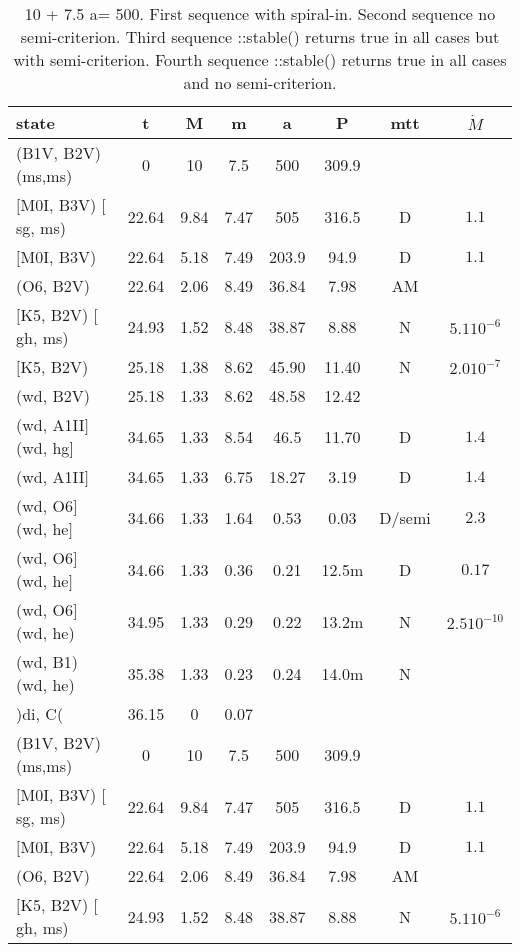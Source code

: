 \documentclass{article}
\begin{document}
\begin{table}
\caption{10 + 7.5 a= 500. 
First sequence with spiral-in.
Second sequence no semi-criterion.
Third sequence ::stable() returns true in all cases but with semi-criterion.
Fourth sequence ::stable() returns true in all cases and no semi-criterion.
}
\begin{tabular}{p{4cm}ccccccc}
\hline
state	 		& t	& M	& m	& a	& P	& mtt	&$\dot{M}$	\\ \hline 
(B1V, B2V) (ms,ms)	& 0	& 10	& 7.5	& 500	& 309.9	&	&			\\
$[$M0I, B3V) $[$sg, ms)	& 22.64	& 9.84	& 7.47	& 505	& 316.5	& D	& $1.1$			\\
$[$M0I, B3V)	 	& 22.64	& 5.18	& 7.49	& 203.9	& 94.9	& D	& $1.1$			\\
(O6, B2V)	 	& 22.64	& 2.06	& 8.49	& 36.84	& 7.98	& AM	&			\\
$[$K5, B2V) $[$gh, ms)	& 24.93	& 1.52	& 8.48	& 38.87	& 8.88	& N	& $5.1 10^{-6}$		\\
$[$K5, B2V)	 	& 25.18	& 1.38	& 8.62	& 45.90	& 11.40	& N	& $2.0 10^{-7}$		\\
(wd, B2V)	 	& 25.18	& 1.33	& 8.62	& 48.58	& 12.42	&	&			\\
(wd, A1II$]$ (wd, hg$]$	& 34.65	& 1.33	& 8.54	& 46.5 	& 11.70	& D	& $1.4$			\\
(wd, A1II$]$	 	& 34.65	& 1.33	& 6.75	& 18.27	& 3.19	& D	& $1.4$			\\
(wd, O6$]$ (wd, he$]$	& 34.66	& 1.33	& 1.64	& 0.53	& 0.03	& D/semi& $2.3$			\\
(wd, O6$]$ (wd, he$]$	& 34.66	& 1.33	& 0.36	& 0.21	& 12.5m	& D	& $0.17$ 		\\
(wd, O6$]$ (wd, he)   	& 34.95	& 1.33 	& 0.29	& 0.22 	& 13.2m	& N     & $2.5 10^{-10}$	\\
(wd, B1) (wd, he)	& 35.38	& 1.33	& 0.23	& 0.24	& 14.0m	& N     &                       \\
)di, C( 	 	& 36.15	& 0	& 0.07	&	&	&	&    			\\ 
 \hline
(B1V, B2V) (ms,ms)	& 0	& 10	& 7.5	& 500	& 309.9	&	&			\\
$[$M0I, B3V) $[$sg, ms)	& 22.64	& 9.84	& 7.47	& 505	& 316.5	& D	& $1.1$			\\
$[$M0I, B3V)	 	& 22.64	& 5.18	& 7.49	& 203.9	& 94.9	& D	& $1.1$			\\
(O6, B2V)	 	& 22.64	& 2.06	& 8.49	& 36.84	& 7.98	& AM	&			\\
$[$K5, B2V) $[$gh, ms)	& 24.93	& 1.52	& 8.48	& 38.87	& 8.88	& N	& $5.1 10^{-6}$		\\

\end{tabular}
\end{table}
\end{document}
